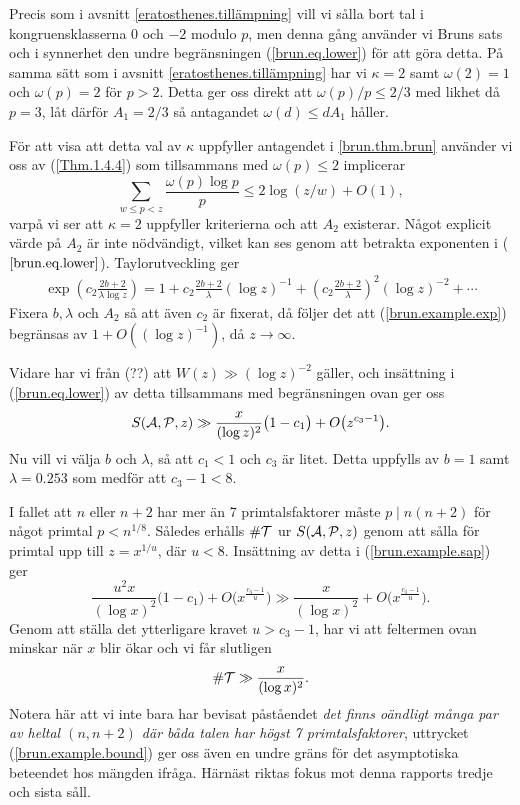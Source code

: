 Precis som i avsnitt \ref{eratosthenes.tillämpning} vill vi sålla bort tal i kongruensklasserna $0$ och $-2$ modulo $p$, 
men denna gång använder vi Bruns sats och i synnerhet den undre begränsningen (\ref{brun.eq.lower}) för att göra detta.
På samma sätt som i avsnitt \ref{eratosthenes.tillämpning} har vi $\kappa=2$ samt $\omega(2)=1$ och $\omega(p)=2$ för $p>2$. Detta ger oss direkt att $\omega(p)/p\leq 2/3$ med likhet då $p=3$, låt därför $A_1=2/3$ så antagandet $\omega(d)\leq dA_1$ håller.

För att visa att detta val av $\kappa$ uppfyller antagendet i \ref{brun.thm.brun} använder vi oss av (\ref{Thm.1.4.4}) som tillsammans med $\omega(p)\leq2$ implicerar
\begin{equation*}
    \sum_{w\leq p<z} \frac{\omega(p)\log p}{p} \leq 2\log\left(z/w\right) + O(1),
\end{equation*}
varpå vi ser att $\kappa=2$ uppfyller kriterierna och att $A_2$ existerar.
Något explicit värde på $A_2$ är inte nödvändigt, vilket kan ses genom att betrakta exponenten i ($\ref{brun.eq.lower}$). Taylorutveckling ger
\begin{align}\label{brun.example.exp}
    \exp\left(c_2\frac{2b+2}{\lambda\log z}\right) = 1 + c_2\frac{2b+2}{\lambda}(\log z)^{-1} + \left(c_2\frac{2b+2}{\lambda}\right)^2(\log z)^{-2} + \cdots
\end{align}
Fixera $b,\lambda$ och $A_2$ så att även $c_2$ är fixerat, då följer det att (\ref{brun.example.exp}) begränsas av $1+O((\log z)^{-1})$, då $z\to\infty$.

Vidare har vi från (??) att $W(z) \gg (\log z)^{-2}$ gäller, och insättning i (\ref{brun.eq.lower}) av detta tillsammans med begränsningen ovan ger oss
\begin{equation} \label{brun.example.sap}
    \S{A}{P}{z} \gg \frac{x}{(\log z)^2}\bigl(1 - c_1\bigr) + O\bigl(z^{c_3 - 1}\bigr).
\end{equation}
Nu vill vi välja $b$ och $\lambda$, så att $c_1<1$ och $c_3$ är litet. 
Detta uppfylls av $b=1$ samt $\lambda=0.253$ som medför att $c_3-1<8$.

I fallet att $n$ eller $n+2$ har mer än 7 primtalsfaktorer måste $p\mid n(n+2)$ för något primtal $p < n^{1/8}$.
Således erhålls $\card\mathcal{T}$ ur $\S{A}{P}{z}$ genom att sålla för primtal upp till $z = x^{1/u}$, där $u<8$.
Insättning av detta i (\ref{brun.example.sap}) ger
\begin{equation*}
    \frac{u^2x}{(\log x)^2}\bigl(1 - c_1\bigr) + O\bigl(x^{\frac{c_3 - 1}{u}}\bigr) \gg 
    \frac{x}{(\log x)^2} + O\bigl(x^{\frac{c_3 - 1}{u}}\bigr).
\end{equation*}
Genom att ställa det ytterligare kravet $u>c_3-1$, har vi att feltermen ovan minskar när $x$ blir ökar och vi får slutligen
\begin{equation} \label{brun.example.bound}
    \card\mathcal{T} \gg \frac{x}{(\log x)^2}.
\end{equation}
Notera här att vi inte bara har bevisat påståendet \textit{det finns oändligt många par av heltal $(n,n+2)$ där båda talen har högst 7 primtalsfaktorer},
uttrycket (\ref{brun.example.bound}) ger oss även en undre gräns för det asymptotiska beteendet hos mängden ifråga.
Härnäst riktas fokus mot denna rapports tredje och sista såll.